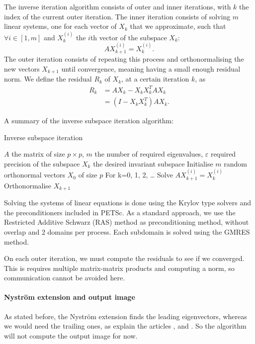 The inverse iteration algorithm consists of outer and inner iterations, with \(k\) the index of the current outer iteration.
The inner iteration consists of solving \(m\) linear systems, one for each vector of \(X_k\) that we approximate, such that \(\forall i \in [1, m]\) and \(X_k^{(i)}\) the \(i\)th vector of the subspace \(X_k\):
\[A X_{k+1}^{(i)} = X_k^{(i)}.\]
The outer iteration consists of repeating this process and orthonormalising the new vectors \(X_{k+1}\) until convergence, meaning having a small enough residual norm.
We define the residual \(R_k\) of \(X_k\), at a certain iteration \(k\), as
\begin{equation}
 \begin{split}
  R_k & = A X_k - X_k X_k^T A X_k \\
      & = (I - X_k X_k^T) A X_k.
 \end{split}
\end{equation}

A summary of the inverse subspace iteration algorithm:

\begin{algorithm}[H]
 \caption{Inverse subspace iteration}
 \begin{algorithmic}
  \REQUIRE \(A\) the matrix of size \(p \times p\), \(m\) the number of required eigenvalues, \(\varepsilon\) required precision of the subspace
  \ENSURE \(X_k\) the desired invariant subspace
  \STATE Initialise \(m\) random orthonormal vectors \(X_0\) of size \(p\)
  \STATE For k=0, 1, 2, \dots
    \STATE Solve \(A X_{k+1}^{(i)} = X_k^{(i)}\)
   \ENDFOR
   \STATE Orthonormalise \(X_{k+1}\)
  \ENDWHILE
 \end{algorithmic}
\end{algorithm}

Solving the systems of linear equations is done using the Krylov type solvers and the preconditioners included in PETSc.
As a standard approach, we use the Restricted Additive Schwarz (RAS) method as preconditioning method, without overlap and 2 domains per process.
Each subdomain is solved using the GMRES method.

On each outer iteration, we must compute the residuals to see if we converged.
This is requires multiple matrix-matrix products and computing a norm, so communication cannot be avoided here.

\paragraph{Nystr\"om extension and output image}
As stated before, the Nystr\"om extension finds the leading eigenvectors, whereas we would need the trailing ones, as explain the articles \cite{belongie_spectral_2002}, \cite{fowlkes_spectral_2004} and \cite{glide_2014}.
So the algorithm will not compute the output image for now.

